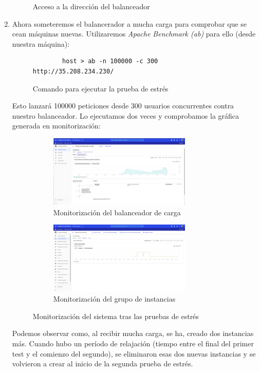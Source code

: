 \documentclass[12pt,spanish]{article}
\begin{document}
\begin{enumerate}
\begin{figure}[H]
		\caption{Acceso a la dirección del balanceador}
	\end{figure}
	\item Ahora someteremos el balancerador a mucha carga para comprobar que se cean máquinas nuevas. Utilizaremos \emph{Apache Benchmark (ab)} para ello (desde nuestra máquina):
	\begin{figure}[H]
		\centering
		\begin{lstlisting}
		host > ab -n 100000 -c 300 http://35.208.234.230/
		\end{lstlisting}
	\caption{Comando para ejecutar la prueba de estrés}
\end{figure}
	Esto lanzará 100000 peticiones desde 300 usuarios concurrentes contra nuestro balanceador. Lo ejecutamos dos veces y comprobamos la gráfica generada en monitorización:
	\begin{figure}[H]
	  \begin{subfigure}[t]{0.5\textwidth}
	    \centering
			\includegraphics[width=0.8\textwidth]{project/monitoring.png}
			\caption{Monitorización del balanceador de carga}
	  \end{subfigure}
	  \hspace{0.5cm}
	  \begin{subfigure}[t]{0.5\textwidth}
	    \centering
			\includegraphics[width=0.8\textwidth]{project/monitoring_groups.png}
			\caption{Monitorización del grupo de instancias}
	  \end{subfigure}
		\caption{Monitorización del sistema tras las pruebas de estrés}
	\end{figure}
	Podemos observar como, al recibir mucha carga, se ha, creado dos instancias más. Cuando hubo un período de relajación (tiempo entre el final del primer test y el comienzo del segundo), se eliminaron esas dos nuevas instancias y se volvieron a crear al inicio de la segunda prueba de estrés.

\end{enumerate}
\end{document}
